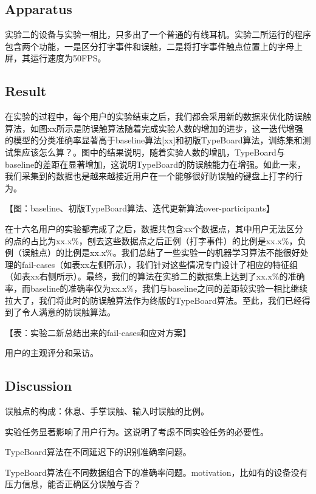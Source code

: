 \subsection{Apparatus}

实验二的设备与实验一相比，只多出了一个普通的有线耳机。实验二所运行的程序包含两个功能，一是区分打字事件和误触，二是将打字事件触点位置上的字母上屏，其运行速度为50FPS。

\subsection{Result}

在实验的过程中，每个用户的实验结束之后，我们都会采用新的数据来优化防误触算法，如图xx所示是防误触算法随着完成实验人数的增加的进步，这一迭代增强的模型的分类准确率显著高于baseline算法[xx]和初版TypeBoard算法，训练集和测试集应该怎么算？。图中的结果说明，随着实验人数的增肌，TypeBoard与baseline的差距在显著增加，这说明TypeBoard的防误触能力在增强。如此一来，我们采集到的数据也是越来越接近用户在一个能够很好防误触的键盘上打字的行为。

【图：baseline、初版TypeBoard算法、迭代更新算法over-participants】

在十六名用户的实验都完成了之后，数据共包含xx个数据点，其中用户无法区分的点的占比为xx.x\%，刨去这些数据点之后正例（打字事件）的比例是xx.x\%，负例（误触点）的比例是xx.x\%。我们总结了一些实验一的机器学习算法不能很好处理的fail-cases（如表xx左侧所示），我们针对这些情况专门设计了相应的特征组（如表xx右侧所示）。最终，我们的算法在实验二的数据集上达到了xx.x\%的准确率，而baseline的准确率仅为xx.x\%，我们与baseline之间的差距较实验一相比继续拉大了，我们将此时的防误触算法作为终版的TypeBoard算法。至此，我们已经得到了令人满意的防误触算法。

【表：实验二新总结出来的fail-cases和应对方案】

用户的主观评分和采访。

\subsection{Discussion}

误触点的构成：休息、手掌误触、输入时误触的比例。

实验任务显著影响了用户行为。这说明了考虑不同实验任务的必要性。

TypeBoard算法在不同延迟下的识别准确率问题。

TypeBoard算法在不同数据组合下的准确率问题。motivation，比如有的设备没有压力信息，能否正确区分误触与否？
